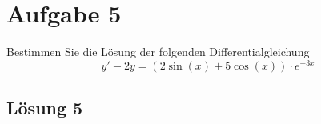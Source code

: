 \documentclass[main.tex]{subfiles}
\begin{document}
\section{Aufgabe 5}
Bestimmen Sie die Lösung der folgenden Differentialgleichung
\[
y' - 2y = (2\sin(x) + 5\cos(x)) \cdot e^{-3x}
\]

\subsection{Lösung 5}
\end{document}

